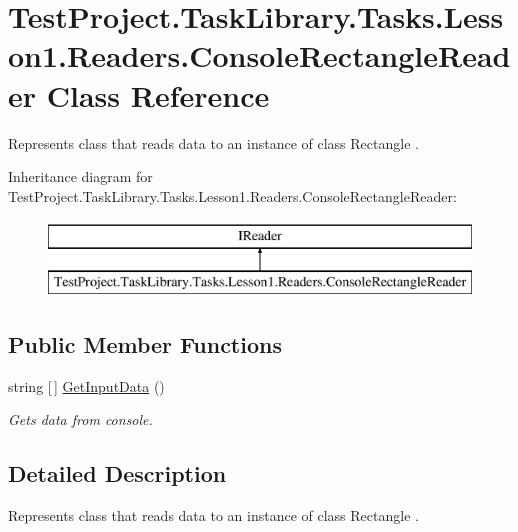 \hypertarget{class_test_project_1_1_task_library_1_1_tasks_1_1_lesson1_1_1_readers_1_1_console_rectangle_reader}{}\section{Test\+Project.\+Task\+Library.\+Tasks.\+Lesson1.\+Readers.\+Console\+Rectangle\+Reader Class Reference}
\label{class_test_project_1_1_task_library_1_1_tasks_1_1_lesson1_1_1_readers_1_1_console_rectangle_reader}


Represents class that reads data to an instance of class Rectangle .  


Inheritance diagram for Test\+Project.\+Task\+Library.\+Tasks.\+Lesson1.\+Readers.\+Console\+Rectangle\+Reader\+:\begin{figure}[H]
\begin{center}
\leavevmode
\includegraphics[height=2.000000cm]{class_test_project_1_1_task_library_1_1_tasks_1_1_lesson1_1_1_readers_1_1_console_rectangle_reader}
\end{center}
\end{figure}
\subsection*{Public Member Functions}
\begin{DoxyCompactItemize}
\item 
string \mbox{[}$\,$\mbox{]} \mbox{\hyperlink{class_test_project_1_1_task_library_1_1_tasks_1_1_lesson1_1_1_readers_1_1_console_rectangle_reader_ae952d087dc237938d093fdf82d9af4b3}{Get\+Input\+Data}} ()
\begin{DoxyCompactList}\small\item\em Gets data from console. \end{DoxyCompactList}\end{DoxyCompactItemize}


\subsection{Detailed Description}
Represents class that reads data to an instance of class Rectangle . 



